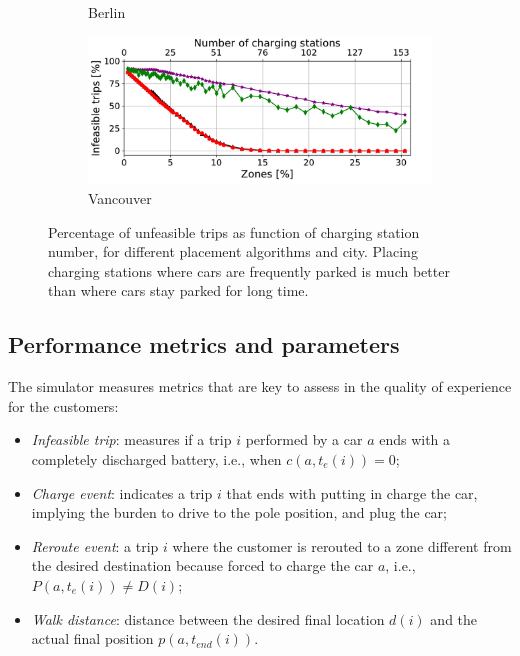\begin{figure}[t!]
\begin{center}
\begin{subfigure}{0.49\textwidth}
             \caption{Berlin}
             \label{fig:zone_vs_deaths_berlino}
         \end{subfigure}
         \begin{subfigure}{0.49\textwidth}
             \includegraphics[width=\columnwidth]{figures/Vancouver_zonesVsDeaths_algorithms_acs-4_tt-25_policy-FreeFloating.pdf}
             \caption{Vancouver}
             \label{fig:zone_vs_deaths_vancouver}
         \end{subfigure}         
 	\caption{Percentage of unfeasible trips as function of charging station number, for different placement algorithms and city. Placing charging stations where cars are frequently parked is much better than where cars stay parked for long time.}
         \label{fig:deathsVsZones_algorithm}
\end{center}
\end{figure}

\subsection{Performance metrics and parameters}

The simulator measures metrics that are  key to assess in the quality of experience for the customers:
\begin{itemize}
 	\item \emph{Infeasible trip}: measures if a trip $i$ performed by a car $a$ ends with a completely discharged battery, i.e., when $c(a,t_{e}(i))= 0$;
 	\item \emph{Charge event}: indicates a trip $i$ that ends with putting in charge the car, implying the burden to drive to the pole position, and plug the car;
 	\item \emph{Reroute event}: a trip $i$ where the customer is rerouted to a zone different from the  desired destination because forced to charge the car $a$, i.e., $P(a,t_{e}(i))\neq D(i)$;
 	\item \emph{Walk distance}: distance between the desired final location $d(i)$ and the actual final position $p(a,t_{end}(i))$.
 \end{itemize}

